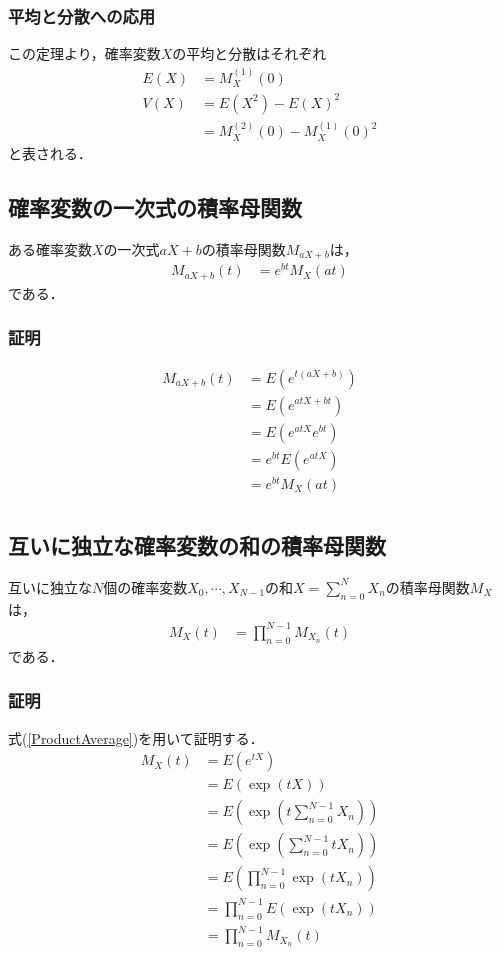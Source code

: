 \documentclass[dvipdfmx]{jsarticle}
\begin{document}
 \subsubsection{平均と分散への応用}
この定理より，確率変数$X$の平均と分散はそれぞれ
 \begin{align}
  E\left(X\right)&=M_X^{\left(1\right)}\left(0\right)\\
  V\left(X\right)&=E\left(X^2\right)-E\left(X\right)^2\nonumber\\
  &=M_X^{\left(2\right)}\left(0\right)-M_X^{\left(1\right)}\left(0\right)^2
 \end{align}
と表される．
 \subsection{確率変数の一次式の積率母関数}
ある確率変数$X$の一次式$aX+b$の積率母関数$M_{aX+b}$は，
 \begin{align}
  M_{aX+b}\left(t\right)&=e^{bt}M_X\left(at\right)
 \end{align}
である．
 \subsubsection{証明}
 \begin{align}
  M_{aX+b}\left(t\right)&=E\left(e^{t\left(aX+b\right)}\right)\nonumber\\
  &=E\left(e^{atX+bt}\right)\nonumber\\
  &=E\left(e^{atX}e^{bt}\right)\nonumber\\
  &=e^{bt}E\left(e^{atX}\right)\nonumber\\
  &=e^{bt}M_X\left(at\right)\nonumber\\
 \end{align}
 \subsection{互いに独立な確率変数の和の積率母関数}
互いに独立な$N$個の確率変数$X_0,\cdots,X_{N-1}$の和$X=\sum_{n=0}^NX_n$の積率母関数$M_X$は，
 \begin{align}
  M_X\left(t\right)&=\prod_{n=0}^{N-1}M_{X_n}\left(t\right)
 \end{align}
である．
 \subsubsection{証明}
式(\ref{ProductAverage})を用いて証明する．
 \begin{align}
  M_X\left(t\right)&=E\left(e^{tX}\right)\nonumber\\
  &=E\left(\exp\left(tX\right)\right)\nonumber\\
  &=E\left(\exp\left(t\sum_{n=0}^{N-1}X_n\right)\right)\nonumber\\
  &=E\left(\exp\left(\sum_{n=0}^{N-1}tX_n\right)\right)\nonumber\\
  &=E\left(\prod_{n=0}^{N-1}\exp\left(tX_n\right)\right)\nonumber\\
  &=\prod_{n=0}^{N-1}E\left(\exp\left(tX_n\right)\right)\nonumber\\
  &=\prod_{n=0}^{N-1}M_{X_n}\left(t\right)
 \end{align}
\end{document}
